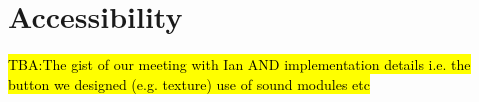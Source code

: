 \let\textcircled=\pgftextcircled
\chapter{Accessibility}
\label{chap:intro}

\hl{TBA:The gist of our meeting with Ian AND implementation details i.e. the button we designed (e.g. texture) use of sound modules etc}